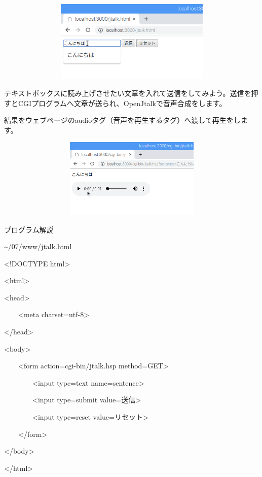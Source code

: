 \documentclass[a4paper,12pt,dvipdfmx]{jarticle}
\begin{document}
\centering
\includegraphics[width=14.319cm,height=3.902cm]{ome7-img056.png}
\flushleft

テキストボックスに読み上げさせたい文章を入れて送信をしてみよう。送信を押すとCGIプログラムへ文章が送られ、OpenJtalkで音声合成をします。


\bigskip

結果をウェブページのaudioタグ（音声を再生するタグ）へ渡して再生をします。

%
%


\centering
\includegraphics[width=14.392cm,height=3.796cm]{ome7-img057.png}
\flushleft

\clearpage
プログラム解説

\~{}/07/www/jtalk.html



\centering
\begin{boxedminipage}{16.148cm}
	{\textless}!DOCTYPE html{\textgreater}

		{\textless}html{\textgreater}

	{\textless}head{\textgreater}

	\ \ \ \ {\textless}meta charset={\textquotedbl}utf-8{\textquotedbl}{\textgreater}

	{\textless}/head{\textgreater}

	{\textless}body{\textgreater}

	\ \ \ \ {\textless}form action={\textquotedbl}cgi-bin/jtalk.hsp{\textquotedbl}
	method={\textquotedbl}GET{\textquotedbl}{\textgreater}

	\ \ \ \ \ \ \ \ {\textless}input type={\textquotedbl}text{\textquotedbl}
	name={\textquotedbl}sentence{\textquotedbl}{\textgreater}

	\ \ \ \ \ \ \ \ {\textless}input type={\textquotedbl}submit{\textquotedbl}
	value={\textquotedbl}送信{\textquotedbl}{\textgreater}

	\ \ \ \ \ \ \ \ {\textless}input type={\textquotedbl}reset{\textquotedbl}
	value={\textquotedbl}リセット{\textquotedbl}{\textgreater}

	\ \ \ \ {\textless}/form{\textgreater}

	{\textless}/body{\textgreater}

	{\textless}/html{\textgreater}
\end{boxedminipage}
\flushleft
\bigskip
\end{document}
